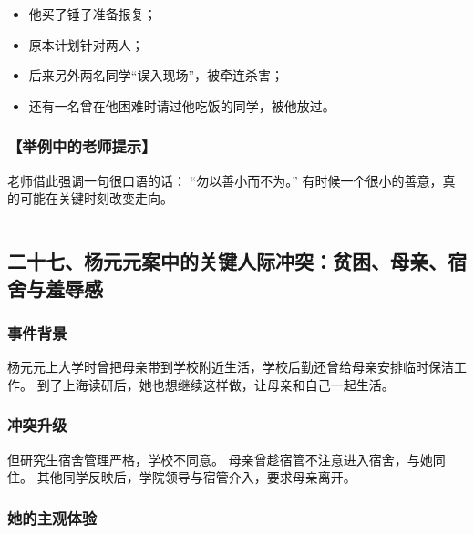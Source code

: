 \documentclass[
  chinese,
  9pt,
  a4paper,
]{ctexart}
\providecommand{\tightlist}{%
  \setlength{\itemsep}{0pt}\setlength{\parskip}{0pt}}
\begin{document}
\begin{itemize}
\tightlist
\item
  他买了锤子准备报复；
\item
  原本计划针对两人；
\item
  后来另外两名同学``误入现场''，被牵连杀害；
\item
  还有一名曾在他困难时请过他吃饭的同学，被他放过。
\end{itemize}

\subsubsection{【举例中的老师提示】}\label{ux4e3eux4f8bux4e2dux7684ux8001ux5e08ux63d0ux793a}

老师借此强调一句很口语的话： ``勿以善小而不为。''
有时候一个很小的善意，真的可能在关键时刻改变走向。

\begin{center}\rule{0.5\linewidth}{0.5pt}\end{center}

\subsection{二十七、杨元元案中的关键人际冲突：贫困、母亲、宿舍与羞辱感}\label{ux4e8cux5341ux4e03ux6768ux5143ux5143ux6848ux4e2dux7684ux5173ux952eux4ebaux9645ux51b2ux7a81ux8d2bux56f0ux6bcdux4eb2ux5bbfux820dux4e0eux7f9eux8fb1ux611f}

\subsubsection{事件背景}\label{ux4e8bux4ef6ux80ccux666f}

杨元元上大学时曾把母亲带到学校附近生活，学校后勤还曾给母亲安排临时保洁工作。
到了上海读研后，她也想继续这样做，让母亲和自己一起生活。

\subsubsection{冲突升级}\label{ux51b2ux7a81ux5347ux7ea7}

但研究生宿舍管理严格，学校不同意。
母亲曾趁宿管不注意进入宿舍，与她同住。
其他同学反映后，学院领导与宿管介入，要求母亲离开。

\subsubsection{她的主观体验}\label{ux5979ux7684ux4e3bux89c2ux4f53ux9a8c}
\end{document}
